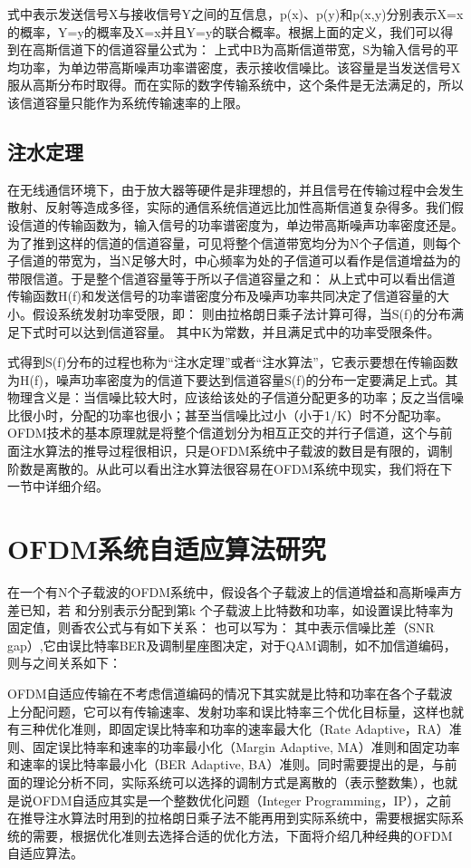 式中表示发送信号X与接收信号Y之间的互信息，p(x)、p(y)和p(x,y)分别表示X=x的概率，Y=y的概率及X=x并且Y=y的联合概率。根据上面的定义，我们可以得到在高斯信道下的信道容量公式为：
上式中B为高斯信道带宽，S为输入信号的平均功率，为单边带高斯噪声功率谱密度，表示接收信噪比。该容量是当发送信号X服从高斯分布时取得。而在实际的数字传输系统中，这个条件是无法满足的，所以该信道容量只能作为系统传输速率的上限。
\subsection{注水定理}
在无线通信环境下，由于放大器等硬件是非理想的，并且信号在传输过程中会发生散射、反射等造成多径，实际的通信系统信道远比加性高斯信道复杂得多。我们假设信道的传输函数为，输入信号的功率谱密度为，单边带高斯噪声功率密度还是。为了推到这样的信道的信道容量，可见将整个信道带宽均分为N个子信道，则每个子信道的带宽为，当N足够大时，中心频率为处的子信道可以看作是信道增益为的带限信道。于是整个信道容量等于所以子信道容量之和：
从上式中可以看出信道传输函数H(f)和发送信号的功率谱密度分布及噪声功率共同决定了信道容量的大小。假设系统发射功率受限，即：
则由拉格朗日乘子法计算可得，当S(f)的分布满足下式时可以达到信道容量。
其中K为常数，并且满足式中的功率受限条件。

式得到S(f)分布的过程也称为“注水定理”或者“注水算法”，它表示要想在传输函数为H(f)，噪声功率密度为的信道下要达到信道容量S(f)的分布一定要满足上式。其物理含义是：当信噪比较大时，应该给该处的子信道分配更多的功率；反之当信噪比很小时，分配的功率也很小；甚至当信噪比过小（小于1/K）时不分配功率。
OFDM技术的基本原理就是将整个信道划分为相互正交的并行子信道，这个与前面注水算法的推导过程很相识，只是OFDM系统中子载波的数目是有限的，调制阶数是离散的。从此可以看出注水算法很容易在OFDM系统中现实，我们将在下一节中详细介绍。
\section{OFDM系统自适应算法研究}
在一个有N个子载波的OFDM系统中，假设各个子载波上的信道增益和高斯噪声方差已知，若 和分别表示分配到第k 个子载波上比特数和功率，如设置误比特率为固定值，则香农公式与有如下关系：
也可以写为：
其中表示信噪比差（SNR gap）,它由误比特率BER及调制星座图决定，对于QAM调制，如不加信道编码，则与之间关系如下\cite{余官定2005ofdm}：

OFDM自适应传输在不考虑信道编码的情况下其实就是比特和功率在各个子载波上分配问题，它可以有传输速率、发射功率和误比特率三个优化目标量，这样也就有三种优化准则，即固定误比特率和功率的速率最大化（Rate Adaptive，RA）准则、固定误比特率和速率的功率最小化（Margin Adaptive, MA）准则和固定功率和速率的误比特率最小化（BER Adaptive, BA）准则。同时需要提出的是，与前面的理论分析不同，实际系统可以选择的调制方式是离散的（表示整数集），也就是说OFDM自适应其实是一个整数优化问题（Integer Programming，IP），之前在推导注水算法时用到的拉格朗日乘子法不能再用到实际系统中，需要根据实际系统的需要，根据优化准则去选择合适的优化方法，下面将介绍几种经典的OFDM自适应算法。
